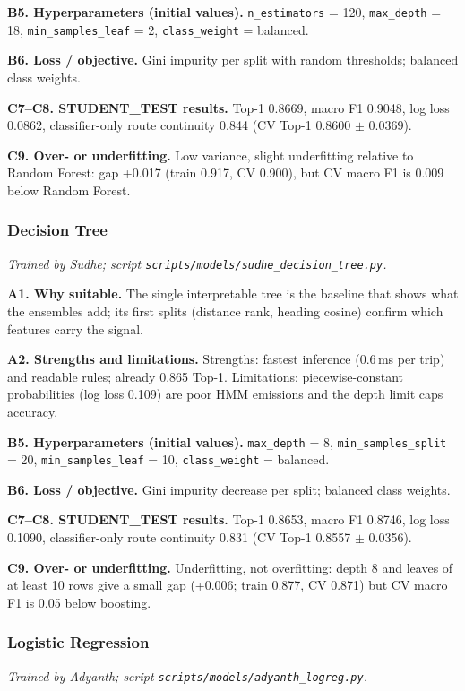 \documentclass[11pt,a4paper]{article}
\begin{document}
\textbf{B5. Hyperparameters (initial values).} \texttt{n\_estimators} = 120, \texttt{max\_depth} = 18, \texttt{min\_samples\_leaf} = 2, \texttt{class\_weight} = balanced.

\textbf{B6. Loss / objective.} Gini impurity per split with random thresholds; balanced class weights.

\textbf{C7--C8. STUDENT\_TEST results.} Top-1 0.8669, macro F1 0.9048, log loss 0.0862, classifier-only route continuity 0.844 (CV Top-1 0.8600 $\pm$ 0.0369).

\textbf{C9. Over- or underfitting.} Low variance, slight underfitting relative to Random Forest: gap +0.017 (train 0.917, CV 0.900), but CV macro F1 is 0.009 below Random Forest.
\subsubsection{Decision Tree}
\textit{Trained by Sudhe; script \texttt{scripts/models/sudhe\_decision\_tree.py}.}

\textbf{A1. Why suitable.} The single interpretable tree is the baseline that shows what the ensembles add; its first splits (distance rank, heading cosine) confirm which features carry the signal.

\textbf{A2. Strengths and limitations.} Strengths: fastest inference (0.6\,ms per trip) and readable rules; already 0.865 Top-1. Limitations: piecewise-constant probabilities (log loss 0.109) are poor HMM emissions and the depth limit caps accuracy.

\textbf{B5. Hyperparameters (initial values).} \texttt{max\_depth} = 8, \texttt{min\_samples\_split} = 20, \texttt{min\_samples\_leaf} = 10, \texttt{class\_weight} = balanced.

\textbf{B6. Loss / objective.} Gini impurity decrease per split; balanced class weights.

\textbf{C7--C8. STUDENT\_TEST results.} Top-1 0.8653, macro F1 0.8746, log loss 0.1090, classifier-only route continuity 0.831 (CV Top-1 0.8557 $\pm$ 0.0356).

\textbf{C9. Over- or underfitting.} Underfitting, not overfitting: depth 8 and leaves of at least 10 rows give a small gap (+0.006; train 0.877, CV 0.871) but CV macro F1 is 0.05 below boosting.
\subsubsection{Logistic Regression}
\textit{Trained by Adyanth; script \texttt{scripts/models/adyanth\_logreg.py}.}
\end{document}
